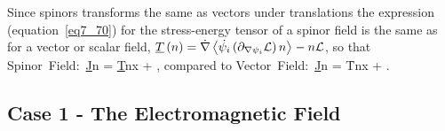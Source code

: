 Since spinors transforms the same as vectors under translations the expression (equation~\ref{eq7_70}) for the stress-energy tensor of a spinor field is the same as for a vector or scalar field, ${\underline{T}}\left ( {n} \right ) = \dot{\nabla}\left \langle {\dot{\psi_{i}}\left ({\partial_{\nabla\psi_{i}}\mathcal{L}} \right )n} \right \rangle_{}-n\mathcal{L}$, so that
\be
	\mbox{Spinor Field: }\f{\underline{J}}{n} = \f{\underline{T}}{n}\W x + ,
\ee
compared to
\be
	\mbox{Vector Field: }\f{\underline{J}}{n} = \f{T}{n}\W x + .
\ee

\subsection{Case 1 - The Electromagnetic Field}

